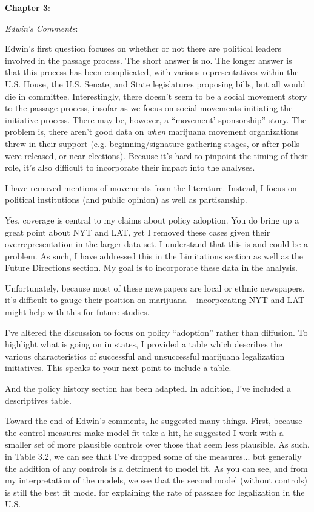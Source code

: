 \documentclass[12pt,stdletter,dateno,sigleft]{newlfm} %
\begin{document}
\begin{newlfm}
\textbf{Chapter 3}: 

\textit{Edwin's Comments}:

Edwin's first question focuses on whether or not there are political leaders involved in the passage process. The short answer is no. The longer answer is that this process has been complicated, with various representatives within the U.S. House, the U.S. Senate, and State legislatures proposing bills, but all would die in committee. Interestingly, there doesn't seem to be a social movement story to the passage process, insofar as we focus on social movements initiating the initiative process. There may be, however, a ``movement' sponsorship'' story. The problem is, there aren't good data on \textit{when} marijuana movement organizations threw in their support (e.g. beginning/signature gathering stages, or after polls were released, or near elections). Because it's hard to pinpoint the timing of their role, it's also difficult to incorporate their impact into the analyses.

I have removed mentions of movements from the literature. Instead, I focus on political institutions (and public opinion) as well as partisanship. 

Yes, coverage is central to my claims about policy adoption. You do bring up a great point about NYT and LAT, yet I removed these cases given their overrepresentation in the larger data set. I understand that this is and could be a problem. As such, I have addressed this in the Limitations section as well as the Future Directions section. My goal is to incorporate these data in the analysis. 

Unfortunately, because most of these newspapers are local or ethnic newspapers, it's difficult to gauge their position on marijuana -- incorporating NYT and LAT might help with this for future studies. 

I've altered the discussion to focus on policy ``adoption'' rather than diffusion. To highlight what is going on in states, I provided a table which describes the various characteristics of successful and unsuccessful marijuana legalization initiatives. This speaks to your next point to include a table. 

And the policy history section has been adapted.  In addition, I've included a descriptives table.

Toward the end of Edwin's comments, he suggested many things. First, because the control measures make model fit take a hit, he suggested I work with a smaller set of more plausible controls over those that seem less plausible. As such, in Table 3.2, we can see that I've dropped some of the measures... but generally the addition of any controls is a detriment to model fit. As you can see, and from my interpretation of the models, we see that the second model (without controls) is still the best fit model for explaining the rate of passage for legalization in the U.S.


\end{newlfm}
\end{document}
